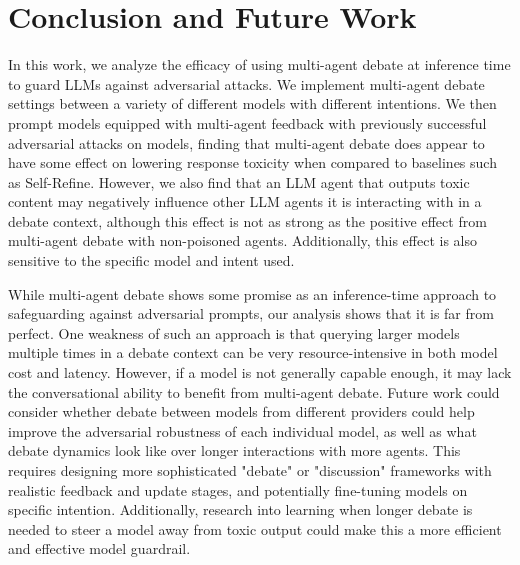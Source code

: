 \section{Conclusion and Future Work}

In this work, we analyze the efficacy of using multi-agent debate at inference time to guard LLMs against adversarial attacks. We implement multi-agent debate settings between a variety of different models with different intentions. We then prompt models equipped with multi-agent feedback with previously successful adversarial attacks on models, finding that multi-agent debate does appear to have some effect on lowering response toxicity when compared to baselines such as Self-Refine. However, we also find that an LLM agent that outputs toxic content may negatively influence other LLM agents it is interacting with in a debate context, although this effect is not as strong as the positive effect from multi-agent debate with non-poisoned agents. Additionally, this effect is also sensitive to the specific model and intent used.

While multi-agent debate shows some promise as an inference-time approach to safeguarding against adversarial prompts, our analysis shows that it is far from perfect. One weakness of such an approach is that querying larger models multiple times in a debate context can be very resource-intensive in both model cost and latency. However, if a model is not generally capable enough, it may lack the conversational ability to benefit from multi-agent debate. Future work could consider whether debate between models from different providers could help improve the adversarial robustness of each individual model, as well as what debate dynamics look like over longer interactions with more agents. This requires designing more sophisticated "debate" or "discussion" frameworks with realistic feedback and update stages, and potentially fine-tuning models on specific intention. Additionally, research into learning when longer debate is needed to steer a model away from toxic output could make this a more efficient and effective model guardrail.